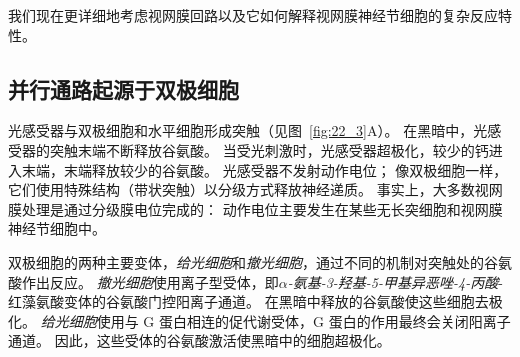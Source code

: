 我们现在更详细地考虑视网膜回路以及它如何解释视网膜神经节细胞的复杂反应特性。


\subsection{并行通路起源于双极细胞}

光感受器与双极细胞和水平细胞形成突触（见图~\ref{fig:22_3}A）。
在黑暗中，光感受器的突触末端不断释放谷氨酸。
当受光刺激时，光感受器超极化，较少的钙进入末端，末端释放较少的谷氨酸。
光感受器不发射动作电位；
像双极细胞一样，它们使用特殊结构（带状突触）以分级方式释放神经递质。
事实上，大多数视网膜处理是通过分级膜电位完成的：
动作电位主要发生在某些无长突细胞和视网膜神经节细胞中。


双极细胞的两种主要变体，\textit{给光细胞}和\textit{撤光细胞}，通过不同的机制对突触处的谷氨酸作出反应。
\textit{撤光细胞}使用离子型受体，即\textit{$\alpha$-氨基-3-羟基-5-甲基异恶唑-4-丙酸}-红藻氨酸变体的谷氨酸门控阳离子通道。
在黑暗中释放的谷氨酸使这些细胞去极化。
\textit{给光细胞}使用与 G 蛋白相连的促代谢受体，G 蛋白的作用最终会关闭阳离子通道。
因此，这些受体的谷氨酸激活使黑暗中的细胞超极化。


